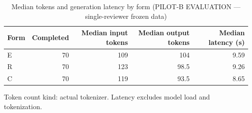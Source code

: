 \begin{table}[t]
\centering
\small
\caption{Median tokens and generation latency by form (PILOT-B EVALUATION --- single-reviewer frozen data)}
\label{tab:pilotb-Qwen3-4B-resources}
\begin{tabular}{lrrrr}
\toprule
Form & Completed & Median input tokens & Median output tokens & Median latency (s) \\
\midrule
E & 70 & 109 & 104 & 9.59 \\
R & 70 & 123 & 98.5 & 9.26 \\
C & 70 & 119 & 93.5 & 8.65 \\
\bottomrule
\end{tabular}
\par\smallskip
\parbox{\linewidth}{\footnotesize Token count kind: actual tokenizer. Latency excludes model load and tokenization.}
\end{table}
